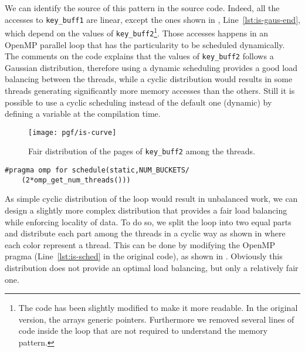 We can identify the source of this pattern in the \IS source code.
Indeed, all the accesses to \texttt{key\_buff1} are linear, except the ones shown in , Line~\ref{lst:is-gaus-end}, which depend on the values of \texttt{key\_buff2}\footnote{
    The code has been slightly modified to make it more readable.
    In the original version, the arrays generic pointers.
    Furthermore we removed several lines of code inside the loop that are not required to understand the memory pattern.
    }.
Those accesses happens in an \gls{OpenMP} parallel loop that has the particularity to be scheduled dynamically.
The comments on the \IS code explains that the values of \texttt{key\_buff2} follows a Gaussian distribution, therefore using a dynamic scheduling provides a good load balancing between the threads, while a cyclic distribution would results in some threads generating significantly more memory accesses than the others.
Still it is possible to use a cyclic scheduling instead of the default one (dynamic) by defining a variable at the compilation time.

\begin{figure}[htb]
    \centering
    \texttt{[image: pgf/is-curve]}
    \caption{Fair distribution of the pages of \texttt{key\_buff2} among the threads.}
    \label{fig:is-fair}
\end{figure}

\begin{lstlisting}[caption={Modified IS code.}, label=lst:is-modif,float=htb]
#pragma omp for schedule(static,NUM_BUCKETS/
    (2*omp_get_num_threads()))
\end{lstlisting}

As simple cyclic distribution of the loop would result in unbalanced work, we can design a slightly more complex distribution that provides a fair load balancing while enforcing locality of data.
To do so, we split the loop into two equal parts and distribute each part among the threads in a cyclic way  as shown in  where each color represent a thread.
This can be done by modifying the \gls{OpenMP} pragma (Line~\ref{lst:is-sched} in the original code), as shown in .
Obviously this distribution does not provide an optimal load balancing, but only a relatively fair one.

